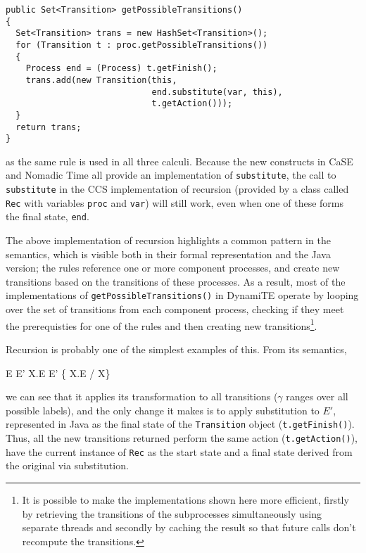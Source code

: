 \begin{verbatim}
public Set<Transition> getPossibleTransitions()
{
  Set<Transition> trans = new HashSet<Transition>();
  for (Transition t : proc.getPossibleTransitions())
  {
    Process end = (Process) t.getFinish();
    trans.add(new Transition(this,
                             end.substitute(var, this),
                             t.getAction()));
  }
  return trans;
}
\end{verbatim}

\noindent as the same rule is used in all three calculi.  Because the
new constructs in CaSE and Nomadic Time all provide an implementation
of \texttt{substitute}, the call to \texttt{substitute} in the CCS
implementation of recursion (provided by a class called \texttt{Rec}
with variables \texttt{proc} and \texttt{var}) will still work, even
when one of these forms the final state, \texttt{end}.

The above implementation of recursion highlights a common pattern in
the semantics, which is visible both in their formal representation
and the Java version; the rules reference one or more component
processes, and create new transitions based on the transitions of
these processes.  As a result, most of the implementations of
\texttt{getPossibleTransitions()} in DynamiTE operate by looping over
the set of transitions from each component process, checking if they
meet the prerequisties for one of the rules and then creating new
transitions\footnote{It is possible to make the implementations shown
  here more efficient, firstly by retrieving the transitions of the
  subprocesses simultaneously using separate threads and secondly by
  caching the result so that future calls don't recompute the
  transitions.}.

Recursion is probably one of the simplest examples of this.  From its
semantics,
\begin{center}
      {E \derives{\gamma} E'}
      {\mu X.E \derives{\gamma} E' \{ \mu X.E / X\}}
      {}
\end{center}
\noindent we can see that it applies its transformation to all
transitions ($\gamma$ ranges over all possible labels), and the only
change it makes is to apply substitution to $E'$, represented in Java
as the final state of the \texttt{Transition} object
(\texttt{t.getFinish()}).  Thus, all the new transitions returned
perform the same action (\texttt{t.getAction()}), have the current
instance of \texttt{Rec} as the start state and a final state derived
from the original via substitution.

